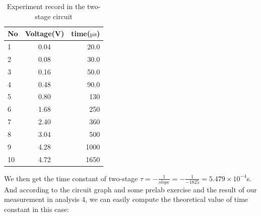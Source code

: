 \begin{table}[!htbp]\centering
	\caption{Experiment record in the two-stage circuit}
	\renewcommand\arraystretch{1.5}
	\begin{tabular}{lcr}
		\toprule
		No		&Voltage(V)	&time($\mathrm{\mu s}$)	\\
		\midrule
		1		&0.04		&20.0		\\

		2		&0.08		&30.0		\\
		
		3		&0.16		&50.0		\\
		
		4		&0.48		&90.0		\\
		
		5		&0.80		&130		\\
		
		6		&1.68		&250		\\
		
		7		&2.40		&360		\\
		
		8		&3.04		&500		\\
		
		9		&4.28		&1000		\\
		
		10		&4.72		&1650		\\
		\bottomrule
	\end{tabular}
\end{table}
\phantom{ } We then get the time constant of two-stage 
$\tau = -\frac{1}{slope} = -\frac{1}{-1825} = 5.479\times10^{-4}$s.\\ And according to the circuit graph and some prelab exercise and the result of our measurement in analysis 4, we can easily compute
the theoretical value of time constant in this case:\\
